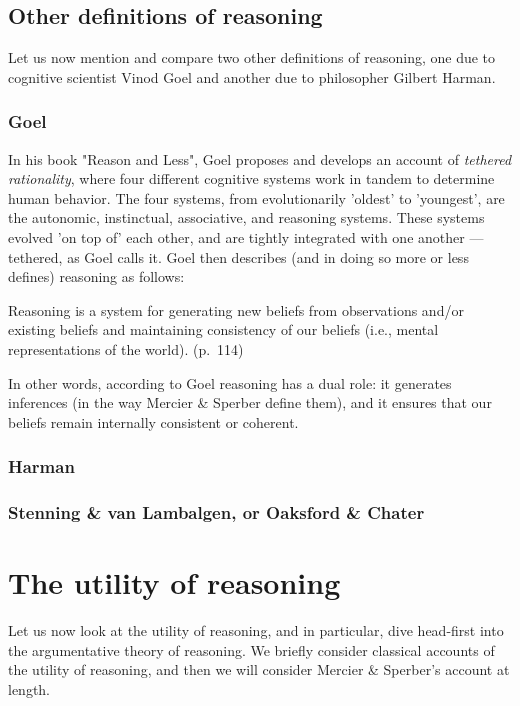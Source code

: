 \subsection{Other definitions of reasoning}
Let us now mention and compare two other definitions of reasoning, one due to cognitive scientist Vinod Goel and another due to philosopher Gilbert Harman.

\subsubsection{Goel}
In his \citeyear{Goel22} book "Reason and Less", Goel proposes and develops an account of \emph{tethered rationality}, where four different cognitive systems work in tandem to determine human behavior. The four systems, from evolutionarily 'oldest' to 'youngest', are the autonomic, instinctual, associative, and reasoning systems. These systems evolved 'on top of' each other, and are tightly integrated with one another --- tethered, as Goel calls it.
Goel then describes (and in doing so more or less defines) reasoning as follows:
\begin{quoting}
    Reasoning is a system for generating new beliefs from observations and/or existing beliefs and maintaining consistency of our beliefs (i.e., mental representations of the world).
    \hfill (p.~114)
\end{quoting}
In other words, according to Goel reasoning has a dual role: it generates inferences (in the way Mercier \& Sperber define them), and it ensures that our beliefs remain internally consistent or coherent.

\subsubsection{Harman}

\subsubsection{Stenning \& van Lambalgen, or Oaksford \& Chater}

\section{The utility of reasoning}
\label{sec:reason-function}

Let us now look at the utility of reasoning, and in particular, dive head-first into the argumentative theory of reasoning.
We briefly consider classical accounts of the utility of reasoning, and then we will consider Mercier \& Sperber's account at length.

